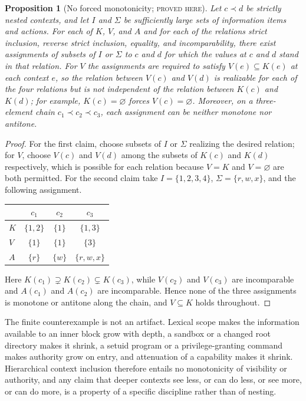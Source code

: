\documentclass[11pt]{article}
\newtheorem{proposition}[theorem]{Proposition}
\theoremstyle{definition}
\theoremstyle{remark}
\newcommand{\stN}{\textsc{proved here}}
\begin{document}
\begin{proposition}[No forced monotonicity; \stN]\label{prop:nomonotone}
Let $c\prec d$ be strictly nested contexts, and let $I$ and $\Sigma$ be sufficiently large sets of information items and actions. For each of $K$, $V$, and $A$ and for each of the relations strict inclusion, reverse strict inclusion, equality, and incomparability, there exist assignments of subsets of $I$ or $\Sigma$ to $c$ and $d$ for which the values at $c$ and $d$ stand in that relation. For $V$ the assignments are required to satisfy $V(e)\subseteq K(e)$ at each context $e$, so the relation between $V(c)$ and $V(d)$ is realizable for each of the four relations but is not independent of the relation between $K(c)$ and $K(d)$; for example, $K(c)=\varnothing$ forces $V(c)=\varnothing$. Moreover, on a three-element chain $c_1\prec c_2\prec c_3$, each assignment can be neither monotone nor antitone.
\end{proposition}
\begin{proof}
For the first claim, choose subsets of $I$ or $\Sigma$ realizing the desired relation; for $V$, choose $V(c)$ and $V(d)$ among the subsets of $K(c)$ and $K(d)$ respectively, which is possible for each relation because $V=K$ and $V=\varnothing$ are both permitted. For the second claim take $I=\{1,2,3,4\}$, $\Sigma=\{r,w,x\}$, and the following assignment.
\begin{center}
\begin{tabular}{lccc}
\toprule
 & $c_1$ & $c_2$ & $c_3$\\
\midrule
$K$ & $\{1,2\}$ & $\{1\}$ & $\{1,3\}$\\
$V$ & $\{1\}$ & $\{1\}$ & $\{3\}$\\
$A$ & $\{r\}$ & $\{w\}$ & $\{r,w,x\}$\\
\bottomrule
\end{tabular}
\end{center}
Here $K(c_1)\supsetneq K(c_2)\subsetneq K(c_3)$, while $V(c_2)$ and $V(c_3)$ are incomparable and $A(c_1)$ and $A(c_2)$ are incomparable. Hence none of the three assignments is monotone or antitone along the chain, and $V\subseteq K$ holds throughout.
\end{proof}

The finite counterexample is not an artifact. Lexical scope makes the information available to an inner block grow with depth, a sandbox or a changed root directory makes it shrink, a setuid program or a privilege-granting command makes authority grow on entry, and attenuation of a capability makes it shrink. Hierarchical context inclusion therefore entails no monotonicity of visibility or authority, and any claim that deeper contexts see less, or can do less, or see more, or can do more, is a property of a specific discipline rather than of nesting.
\end{document}
